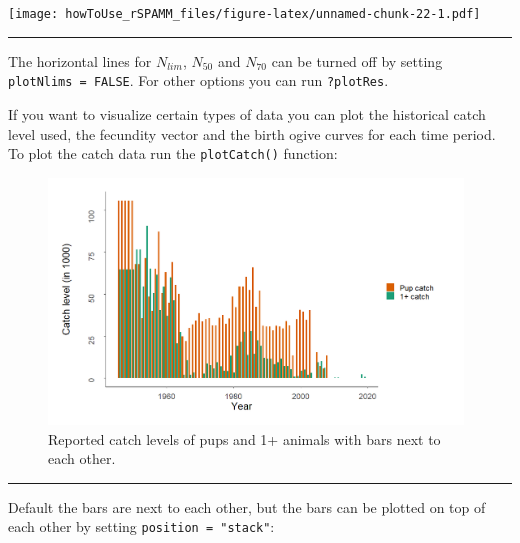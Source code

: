 \documentclass[
]{article}
\newenvironment{Shaded}{\begin{snugshade}}{\end{snugshade}}
\newcommand{\DataTypeTok}[1]{\textcolor[rgb]{0.13,0.29,0.53}{#1}}
\newcommand{\KeywordTok}[1]{\textcolor[rgb]{0.13,0.29,0.53}{\textbf{#1}}}
\newcommand{\NormalTok}[1]{#1}
\newcommand{\OperatorTok}[1]{\textcolor[rgb]{0.81,0.36,0.00}{\textbf{#1}}}
\newcommand{\StringTok}[1]{\textcolor[rgb]{0.31,0.60,0.02}{#1}}
\begin{document}
\texttt{[image: howToUse\_rSPAMM\_files/figure-latex/unnamed-chunk-22-1.pdf]}

\begin{center}\rule{0.5\linewidth}{0.5pt}\end{center}

The horizontal lines for \(N_{lim}\), \(N_{50}\) and \(N_{70}\) can be
turned off by setting \texttt{plotNlims\ =\ FALSE}. For other options
you can run \texttt{?plotRes}.

If you want to visualize certain types of data you can plot the
historical catch level used, the fecundity vector and the birth ogive
curves for each time period. To plot the catch data run the
\texttt{plotCatch()} function:

\begin{Shaded}
\end{Shaded}

\begin{figure}
\centering
\includegraphics[width=0.98\textwidth,height=\textheight]{figures/catch_data_dodge_new.png}
\caption{Reported catch levels of pups and 1+ animals with bars next to
each other.}
\end{figure}

\begin{center}\rule{0.5\linewidth}{0.5pt}\end{center}

Default the bars are next to each other, but the bars can be plotted on
top of each other by setting \texttt{position\ =\ "stack"}:

\begin{Shaded}
\end{Shaded}
\end{document}
